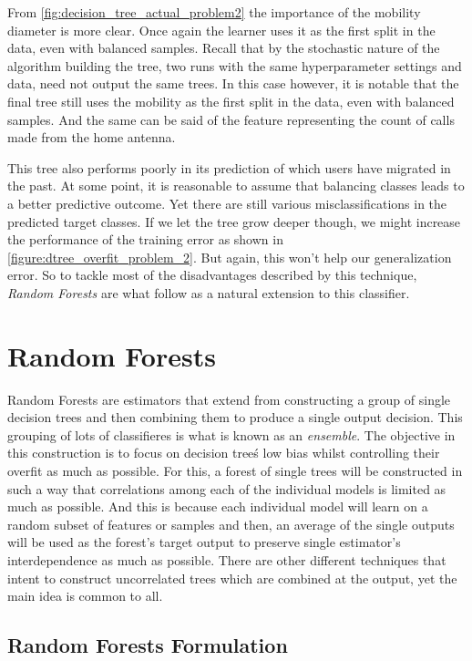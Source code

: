 \smallskip

From \cref{fig:decision_tree_actual_problem2} the importance of the mobility diameter is more clear.
Once again the learner uses it as the first split in the data, even with balanced samples.
Recall that by the stochastic nature of the algorithm building the tree, two runs with the same hyperparameter settings and data, need not output the same trees.
In this case however, it is notable that the final tree still uses the mobility as the first split in the data, even with balanced samples.
And the same can be said of the feature representing the count of calls made from the home antenna.

This tree also performs poorly in its prediction of which users have migrated in the past.
At some point, it is reasonable to assume that balancing classes leads to a better predictive outcome.
Yet there are still various misclassifications in the predicted target classes.
If we let the tree grow deeper though, we might increase the performance of the training error as shown in \cref{figure:dtree_overfit_problem_2}.
But again, this won't help our generalization error.
So to tackle most of the disadvantages described by this technique, \textit{Random Forests} are what follow as a natural extension to this classifier.


\section{ Random Forests}\label{section:random_forests}

Random Forests are estimators that extend from constructing a group of single decision trees and then combining them to produce a single output decision.
This grouping of lots of classifieres is what is known as an \textit{ensemble}.
The objective in this construction is to focus on decision tree\'s low bias whilst controlling their overfit as much as possible.
For this, a forest of single trees will be constructed in such a way that correlations among each of the individual models is limited as much as possible.
And this is because each individual model will learn on a random subset of features or samples and then, an average of the single outputs will be used as the forest's target output to preserve single estimator's interdependence as much as possible.
There  are other different techniques that intent to construct uncorrelated trees which are combined at the output, yet the main idea is common to all.

\subsection{ Random Forests Formulation}\label{subsection:random_forests_formulation}

